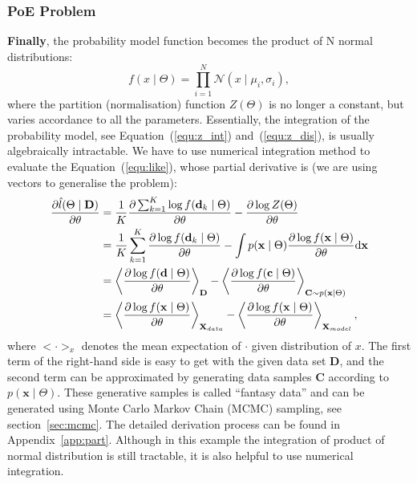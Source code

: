 \subsubsection{PoE Problem}
\textbf{Finally}, the probability model function becomes the product of N normal distributions: 
\begin{equation}
f(x \mid \Theta ) = \prod_{i=1}^N\mathcal{N}(x \mid \mu_i, \sigma_i ),
\end{equation}
where the partition (normalisation) function $Z( \Theta)$ is no longer a constant, but varies accordance to all the parameters.
Essentially, the integration of the probability model, see Equation~(\ref{equ:z_int}) and~(\ref{equ:z_dis}), is usually algebraically intractable.
We have to use numerical integration method to evaluate the Equation~(\ref{equ:like}), whose partial derivative is (we are using vectors to generalise the problem):
\begin{equation}
\label{equ:part}
\begin{aligned}
\dfrac{\partial \hat{l} (\Theta \mid \mathbf{D})}{\partial \theta} 
& = \frac{1}{K} \dfrac{\partial \sum_{k=1}^K\log f(\mathbf{d}_k \mid \Theta )}{\partial \theta} - \dfrac{\partial \log Z( \Theta)}{\partial \theta}\\
& =  \frac{1}{K}\sum_{k=1}^K \dfrac{\partial \log f(\mathbf{d}_k \mid \Theta)}{\partial \theta} - \int p(\mathbf{x} \mid \Theta) \dfrac{\partial \log f(\mathbf{x} \mid \Theta)}{\partial \theta} \mathrm{d} \mathbf{x}\\
& = \left \langle \dfrac{\partial \log f(\mathbf{d} \mid \Theta)}{\partial \theta}\right \rangle_{\mathbf{D}} -\left \langle \dfrac{\partial \log f(\mathbf{c} \mid \Theta)}{\partial \theta}\right \rangle_{\mathbf{C} \sim p(\mathbf{x} \mid \Theta)}  \\
&=\left \langle \dfrac{\partial \log f(\mathbf{x} \mid \Theta)}{\partial \theta}\right \rangle_{\mathbf{X}_{data}} - \left \langle \dfrac{\partial \log f(\mathbf{x} \mid \Theta)}{\partial \theta}\right \rangle_{\mathbf{X}_{model}},
\end{aligned}
\end{equation}
where  $ <\cdot>_x $ denotes the mean expectation of $ \cdot $ given distribution of $x$.
The first term of the right-hand side is easy to get with the given data set $ \mathbf{D} $, and the second term can be approximated by generating data samples $ \mathbf{C} $ according to $ p(\mathbf{x} \mid \Theta) $.
These generative samples is called ``fantasy data'' and can be generated using Monte Carlo Markov Chain (MCMC) sampling, see section~\ref{sec:mcmc}.
The detailed derivation process can be found in Appendix~\ref{app:part}.
Although in this example the integration of product of normal distribution is still tractable, it is also helpful to use numerical integration.

